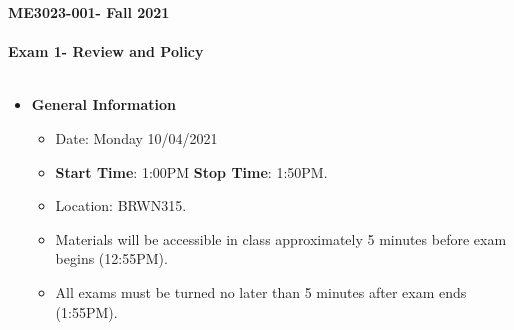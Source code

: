 \documentclass[11pt]{article}
\newcommand{\EXAMNUM}{1\hspace{0mm}}
\newcommand{\SECNUM}{001\hspace{0mm}}
\begin{document}
\textbf{ \LARGE ME3023-\SECNUM - Fall 2021} \\\\
\textbf{ \LARGE \hspace*{5mm} Exam \EXAMNUM \hspace{2mm}- Review and Policy  } \\\\

\begin{itemize}
	\item  \textbf{\Large General Information}

	\begin{itemize}

		\item Date: Monday 10/04/2021
		\item {\bf Start Time}: 1:00PM {\bf Stop Time}: 1:50PM.
		\item Location: BRWN315. 
		 
		\item Materials will be accessible in class approximately 5 minutes before exam begins (12:55PM).
		\item All exams must be turned no later than 5 minutes after exam ends (1:55PM). \vspace{1mm}\\
		
	\end{itemize}


\end{itemize}
\end{document}
